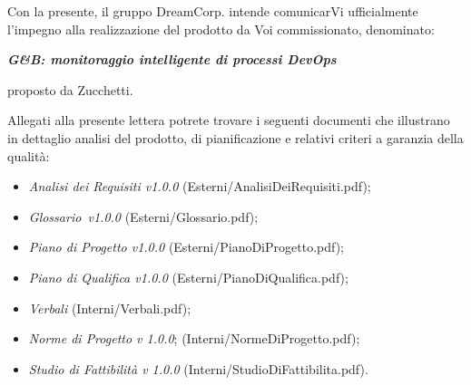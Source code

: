\documentclass[10pt,stdletter,dateno,sigright]{newlfm}
\begin{document}
\begin{newlfm}


Con la presente, il gruppo DreamCorp. intende comunicarVi ufficialmente l'impegno alla realizzazione del prodotto da Voi commissionato, denominato:
\begin{center}
    \textbf{\textit{G\&B: monitoraggio intelligente di processi DevOps}}
\end{center}
proposto da Zucchetti.

Allegati alla presente lettera potrete trovare i seguenti documenti che illustrano in dettaglio analisi del prodotto, di pianificazione e relativi criteri a garanzia della qualità:
 
\begin{itemize}
    \item \textit{Analisi dei Requisiti v1.0.0} (Esterni/AnalisiDeiRequisiti.pdf);
    \item \textit{Glossario\ v1.0.0} (Esterni/Glossario.pdf);
    \item \textit{Piano di Progetto v1.0.0} (Esterni/PianoDiProgetto.pdf);
    \item \textit{Piano di Qualifica v1.0.0} (Esterni/PianoDiQualifica.pdf);
    \item \textit{Verbali} (Interni/Verbali.pdf);
    \item \textit{Norme di Progetto v 1.0.0}; (Interni/NormeDiProgetto.pdf);
    \item \textit{Studio di Fattibilità v 1.0.0} (Interni/StudioDiFattibilita.pdf).
\end{itemize}
 

\end{newlfm}
\end{document}
